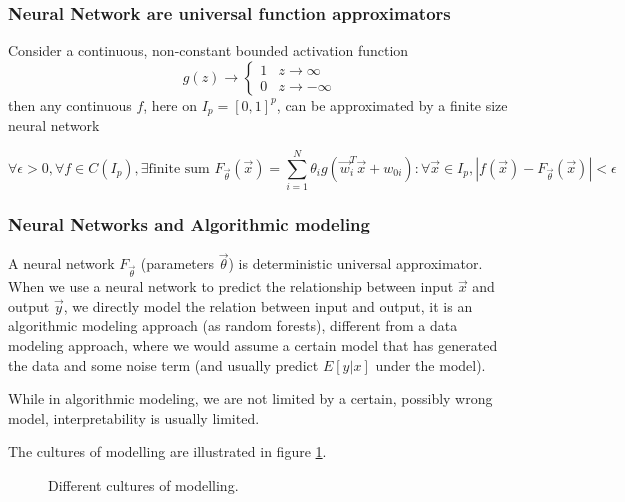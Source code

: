 \subsubsection{Neural Network are universal function approximators}

Consider a continuous, non-constant bounded activation function
\begin{equation}
    g(z) \rightarrow \begin{cases}
        1 & z \rightarrow \infty \\
        0 & z \rightarrow -\infty
    \end{cases}
\end{equation}
then any continuous $f$, here on $I_p = [0,1]^p$, can be approximated by a finite size
neural network

\begin{equation}
    \forall \epsilon > 0, \forall f \in C(I_p), \exists \text{finite sum } F_\vec{\theta}(\vec{x}) = \sum_{i=1}^{N} \theta_i g(\vec{w}_i^T \vec{x} + w_{0i}): \forall \vec{x} \in I_p, |f(\vec{x}) - F_\vec{\theta}(\vec{x})| < \epsilon
\end{equation}

\subsubsection{Neural Networks and Algorithmic modeling}
A neural network $F_\vec{\theta}$ (parameters $\vec{\theta}$) is deterministic universal
approximator. When we use a neural network to predict the relationship between input $\vec{x}$
and output $\vec{y}$, we directly model the relation between input and output, it is an algorithmic
modeling approach (as random forests), different from a data modeling approach, where we would assume a certain
model that has generated the data and some noise term \citep{breiman01} (and usually predict $E[y|x]$ under the model).

While in algorithmic modeling, we are not limited by a certain, possibly wrong model, interpretability
is usually limited.

The cultures of modelling are illustrated in figure \ref{fig:modelling_cultures}.

\begin{figure}[!htb]
    \centering
    
    \caption{Different cultures of modelling.}
    \label{fig:modelling_cultures}
\end{figure}

